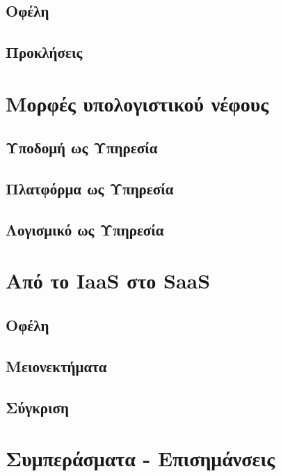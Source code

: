 \documentclass{article}
\begin{document}
\subsection{Οφέλη}
\subsection{Προκλήσεις}
\section{Μορφές υπολογιστικού νέφους}
\subsection{Υποδομή ως Υπηρεσία}
\subsection{Πλατφόρμα ως Υπηρεσία}
\subsection{Λογισμικό ως Υπηρεσία}
\section{Από το IaaS στο SaaS}
\subsection{Οφέλη}
\subsection{Μειονεκτήματα}
\subsection{Σύγκριση}
\section{Συμπεράσματα - Επισημάνσεις}
\end{document}
